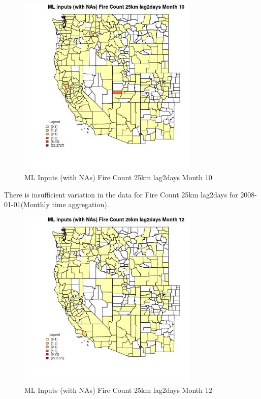 \begin{figure} 
\centering  
\includegraphics[width=0.77\textwidth]{Code_Outputs/Report_ML_input_PM25_Step4_part_f_de_duplicated_aveswNAs_CountyFire_Count_25km_lag2daysmedianMonth10.jpg} 
\caption{\label{fig:Report_ML_input_PM25_Step4_part_f_de_duplicated_aveswNAsCountyFire_Count_25km_lag2daysmedianMonth10}ML Inputs (with NAs) Fire Count 25km lag2days Month 10} 
\end{figure} 
 

There is insufficient variation in the data for Fire Count 25km lag2days for 2008-01-01(Monthly time aggregation). 
 

\begin{figure} 
\centering  
\includegraphics[width=0.77\textwidth]{Code_Outputs/Report_ML_input_PM25_Step4_part_f_de_duplicated_aveswNAs_CountyFire_Count_25km_lag2daysmedianMonth12.jpg} 
\caption{\label{fig:Report_ML_input_PM25_Step4_part_f_de_duplicated_aveswNAsCountyFire_Count_25km_lag2daysmedianMonth12}ML Inputs (with NAs) Fire Count 25km lag2days Month 12} 
\end{figure} 
 

